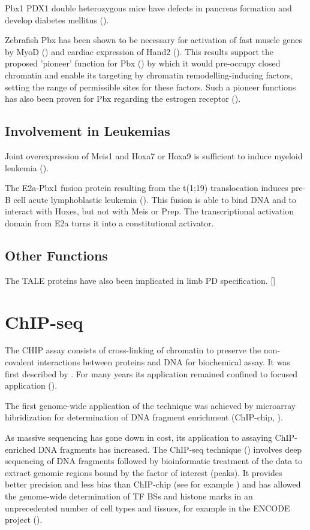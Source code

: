 Pbx1 PDX1 double heterozygous mice have defects in pancreas formation and develop diabetes mellitus (\cite{Kim2002}). 

Zebrafish Pbx has been shown to be necessary for activation of fast muscle genes by MyoD (\cite{Maves2007}) and cardiac expression of Hand2 (\cite{Maves2009}). This results support the proposed 'pioneer' function for Pbx (\cite{Berkes2004}) by which it would pre-occupy closed chromatin and enable its targeting by chromatin remodelling-inducing factors, setting the range of permissible sites for these factors. Such a pioneer functions has also been proven for Pbx regarding the estrogen receptor (\cite{Magnani2011}). %

\subsection{Involvement in Leukemias}

Joint overexpression of Meis1 and Hoxa7 or Hoxa9 is sufficient to induce myeloid leukemia (\cite{Nakamura1996, Schnabel2000}).

The E2a-Pbx1 fusion protein resulting from the t(1;19) translocation induces pre-B cell acute lymphoblastic leukemia (\cite{Kamps1990}). This fusion is able to bind DNA and to interact with Hoxes, but not with Meis or Prep. The transcriptional activation domain from E2a turns it into a constitutional activator. 

\subsection{Other Functions}

The \ac{TALE} proteins have also been implicated in limb \ac{PD} specification. []

\section{ChIP-seq}


The \ac{CHIP} assay consists of cross-linking of chromatin to preserve the non-covalent interactions between proteins and DNA for biochemical assay. It was first described by \cite{Solomon1988}. For many years its application remained confined to focused application (\cite{Mardis2007}).  

The first genome-wide application of the technique was achieved by microarray hibridization for determination of DNA fragment enrichment (ChIP-chip, \cite{Ren2000}). 

As massive sequencing has gone down in cost, its application to assaying ChIP-enriched DNA fragments has increased. The ChIP-seq technique (\cite{Robertson2007}) involves deep sequencing of DNA fragments followed by bioinformatic treatment of the data to extract genomic regions bound by the factor of interest (peaks). It provides better precision and less bias than ChIP-chip (see for example \cite{Rhee2011}) and has allowed the genome-wide determination of \ac{TF} \acp{BS} and histone  marks in an unprecedented number of cell types and tissues, for example in the ENCODE project (\cite{2004, 2007, 2012}).



